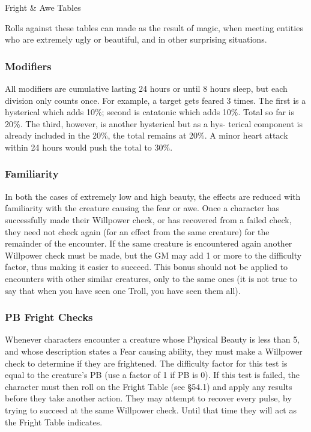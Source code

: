 \begin{Tables}{Fright \& Awe Tables}

\begin{multicols}{3}
    
Rolls against these tables can made as the result of magic, when
meeting entities who are extremely ugly or beautiful, and in other
surprising situations.

\subsubsection{Modifiers}

All modifiers are cumulative lasting 24 hours or until 8 hours sleep,
but each division only counts once.  For example, a target gets feared
3 times.  The first is a hysterical which adds 10\%; second is
catatonic which adds 10\%.  Total so far is 20\%.  The third, however,
is another hysterical but as a hys- terical component is already
included in the 20\%, the total remains at 20\%.  A minor heart attack
within 24 hours would push the total to 30\%.

\subsubsection{Familiarity}

In both the cases of extremely low and high beauty, the effects are
reduced with familiarity with the creature causing the fear or awe.
Once a character has successfully made their Willpower check, or has
recovered from a failed check, they need not check again (for an
effect from the same creature) for the remainder of the encounter.  If
the same creature is encountered again another Willpower check must be
made, but the GM may add 1 or more to the difficulty factor, thus
making it easier to succeed.  This bonus should not be applied to
encounters with other similar creatures, only to the
same ones (it is not true to say that when you have 
seen one Troll, you have seen them all). 

\subsubsection{PB Fright Checks}

Whenever characters encounter a creature whose Physical Beauty is less
than 5, and whose description states a Fear causing ability, they must
make a Willpower check to determine if they are frightened.  The
difficulty factor for this test is equal to the creature’s PB (use a
factor of 1 if PB is 0).  If this test is failed, the character must
then roll on the Fright Table (see §54.1) and apply any results before
they take another action. They may attempt to recover every pulse, by
trying to succeed at the same Willpower check.  Until that time they
will act as the Fright Table indicates.


\end{multicols}
\end{Tables}
